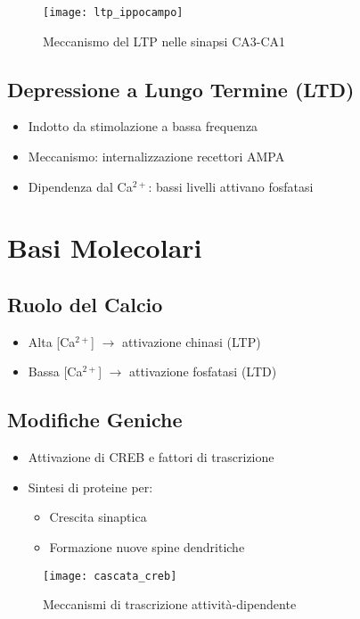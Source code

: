 \documentclass[12pt]{article}
\begin{document}
\begin{figure}[h]
    \centering
    \texttt{[image: ltp\_ippocampo]}
    \caption{Meccanismo del LTP nelle sinapsi CA3-CA1}
\end{figure}

\subsection{Depressione a Lungo Termine (LTD)}
\begin{itemize}
    \item Indotto da stimolazione a bassa frequenza
    \item Meccanismo: internalizzazione recettori AMPA
    \item Dipendenza dal Ca$^{2+}$: bassi livelli attivano fosfatasi
\end{itemize}

\section{Basi Molecolari}
\subsection{Ruolo del Calcio}
\begin{itemize}
    \item Alta [Ca$^{2+}$] $\rightarrow$ attivazione chinasi (LTP)
    \item Bassa [Ca$^{2+}$] $\rightarrow$ attivazione fosfatasi (LTD)
\end{itemize}

\subsection{Modifiche Geniche}
\begin{itemize}
    \item Attivazione di CREB e fattori di trascrizione
    \item Sintesi di proteine per:
    \begin{itemize}
        \item Crescita sinaptica
        \item Formazione nuove spine dendritiche
    \end{itemize}
\end{itemize}

\begin{figure}[h]
    \centering
    \texttt{[image: cascata\_creb]}
    \caption{Meccanismi di trascrizione attività-dipendente}
\end{figure}
\end{document}
